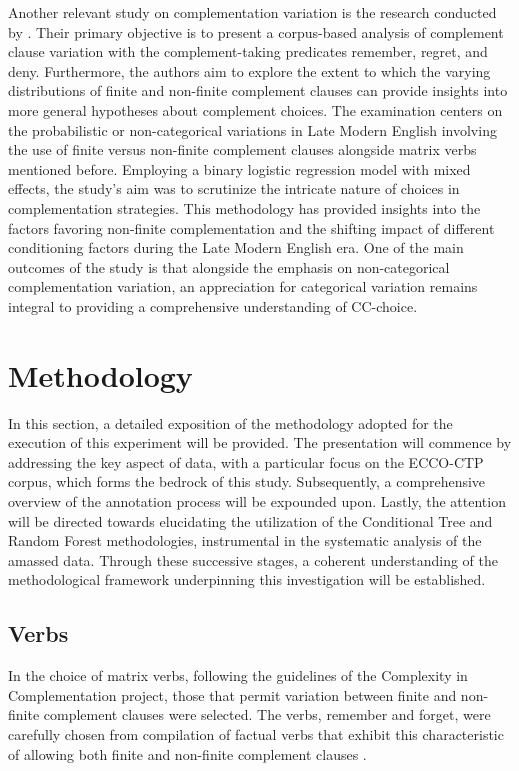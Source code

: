 \documentclass[final]{clv3} %
\begin{document}
Another relevant study on complementation variation is the research conducted by \citeauthor{cuyckens2014variability} \citeyearpar{cuyckens2014variability}. Their primary objective is to present a corpus-based analysis of complement clause variation with the complement-taking predicates remember, regret, and deny. Furthermore, the authors aim to explore the extent to which the varying distributions of finite and non-finite complement clauses can provide insights into more general hypotheses about complement choices. The examination centers on the probabilistic or non-categorical variations in Late Modern English involving the use of finite versus non-finite complement clauses alongside matrix verbs mentioned before. Employing a binary logistic regression model with mixed effects, the study’s aim was to scrutinize the intricate nature of choices in complementation strategies. This methodology has provided insights into the factors favoring non-finite complementation and the shifting impact of different conditioning factors during the Late Modern English era. One of the main outcomes of the study is that alongside the emphasis on non-categorical complementation variation, an appreciation for categorical variation remains integral to providing a comprehensive understanding of CC-choice.

\section{Methodology}

In this section, a detailed exposition of the methodology adopted for the execution of this experiment will be provided. The presentation will commence by addressing the key aspect of data, with a particular focus on the ECCO-CTP corpus, which forms the bedrock of this study. Subsequently, a comprehensive overview of the annotation process will be expounded upon. Lastly, the attention will be directed towards elucidating the utilization of the Conditional Tree and Random Forest methodologies, instrumental in the systematic analysis of the amassed data. Through these successive stages, a coherent understanding of the methodological framework underpinning this investigation will be established.

\subsection{Verbs}
In the choice of matrix verbs, following the guidelines of the Complexity in Complementation project, those that permit variation between finite and non-finite complement clauses were selected. The verbs, remember and forget, were carefully chosen from \citet{quirk1985comprehensive} \citeyearpar{quirk1985comprehensive} compilation of factual verbs that exhibit this characteristic of allowing both finite and non-finite complement clauses \citep{cuyckens2014variability}.
\end{document}
